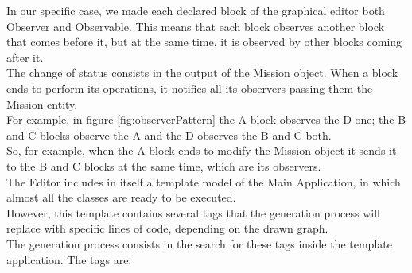 In our specific case, we made each declared block of the graphical editor both Observer and Observable. 
This means that each block observes another block that comes before it, but at the same time, it is observed by other blocks coming after it.
\\
The change of status consists in the output of the Mission object.
When a block ends to perform its operations, it notifies all its observers passing them the Mission entity.
\\
For example, in figure \ref{fig:observerPattern} the A block observes the D one; the B and C blocks observe the A and the D observes the B and C both.
\\
So, for example, when the A block ends to modify the Mission object it sends it to the B and C blocks at the same time, which are its observers.
\\

The Editor includes in itself a template model of the Main Application, in which almost all the classes are ready to be executed.
\\
However, this template contains several tags that the generation process will replace with specific lines of code, depending on the drawn graph.
\\
The generation process consists in the search for these tags inside the template application. The tags are:
\\

